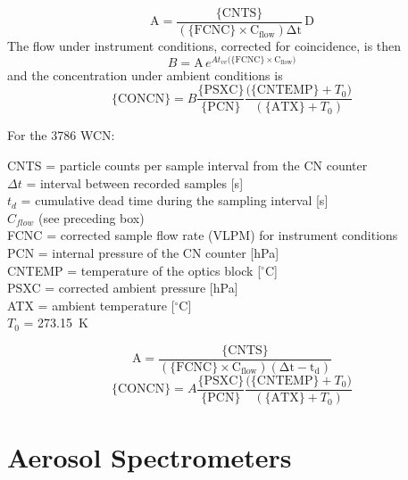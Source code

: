 \documentclass[
  english,
]{book}
\begin{document}
\begin{equation}
\mathrm{A=\frac{\{CNTS\}}{\mathrm{(\{FCNC\}\times C_{flow})}\Delta t}\,D}
\label{eq:CONCNbox1}
\end{equation}
The flow under instrument conditions, corrected for coincidence, is
then\\
\begin{equation}
B\mathrm{=A}\,e^{At_{vv}(\mathrm{\{FCNC\}\times C_{flow})}}
\label{eq:CONCNbox2}
\end{equation}
and the concentration under ambient conditions is\\
\begin{equation}
\mathrm{\{CONCN\}}=B\frac{\mathrm{\{PSXC\}}}{\mathrm{\{PCN\}}}\frac{\mathrm{(\{CNTEMP\}}+T_{0})}{(\mathrm{\{ATX\}}+T_{0})}
\label{eq:CONCNbox3}
\end{equation}

For the 3786 WCN:

CNTS = particle counts per sample interval from the CN counter\\
\(\Delta t\) = interval
between recorded samples {[}s{]}\\
\(t_{d}\) = cumulative dead time during the sampling interval {[}s{]}\\
\(C_{flow}\) (see preceding box)\\
FCNC = corrected sample flow rate (VLPM) for instrument conditions\\
PCN = internal pressure of the CN counter {[}hPa{]}\\
CNTEMP = temperature of the optics block {[}\(^{\circ}\)C{]}\\
PSXC = corrected ambient pressure {[}hPa{]}\\
ATX = ambient temperature {[}\(^{\circ}\)C{]}\\
\(T_{0}\) = 273.15~K

\begin{equation}
\mathrm{A=\frac{\{CNTS\}}{\mathrm{(\{FCNC\}\times C_{flow})}(\Delta t-t_{d})}}
\label{eq:CONCN2box1}
\end{equation}
\begin{equation}
\mathrm{\{CONCN\}}=A\frac{\mathrm{\{PSXC\}}}{\mathrm{\{PCN\}}}\frac{\mathrm{(\{CNTEMP\}}+T_{0})}{(\mathrm{\{ATX\}}+T_{0})}
\label{eq:cwCONCN2box2}
\end{equation}

\hypertarget{aerosol-spectrometers}{%
\section{Aerosol Spectrometers}\label{aerosol-spectrometers}}
\end{document}

